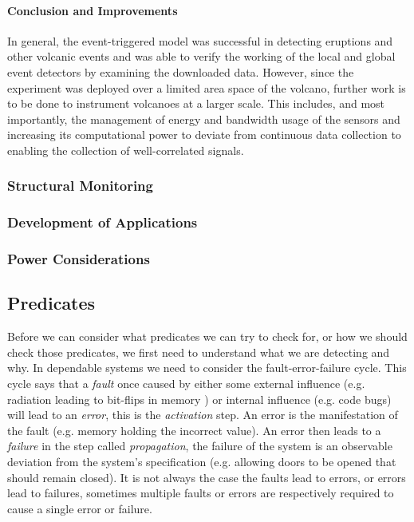 \paragraph{Conclusion and Improvements}

In general, the event-triggered model was successful in detecting eruptions and other volcanic events and was able to verify the working of the local and global event detectors by examining the downloaded data. However, since the experiment was deployed over a limited area space of the volcano, further work is to be done to instrument volcanoes at a larger scale. This includes, and most importantly, the management of energy and bandwidth usage of the sensors and increasing its computational power to deviate from continuous data collection to enabling the collection of well-correlated signals. 

\subsubsection{Structural Monitoring}
\cite{5508230}

\subsubsection{Development of Applications}
\cite{Fagerstrom:1988:DTD:55823.55833}


\subsubsection{Power Considerations}


\subsection{Predicates}

Before we can consider what predicates we can try to check for, or how we should check those predicates, we first need to understand what we are detecting and why. In dependable systems we need to consider the fault-error-failure cycle. This cycle says that a \emph{fault} once caused by either some external influence (e.g. radiation leading to bit-flips in memory \cite{?}) or internal influence (e.g. code bugs) will lead to an \emph{error}, this is the \emph{activation} step. An error is the manifestation of the fault (e.g. memory holding the incorrect value). An error then leads to a \emph{failure} in the step called \emph{propagation}, the failure of the system is an observable deviation from the system's specification (e.g. allowing doors to be opened that should remain closed). It is not always the case the faults lead to errors, or errors lead to failures, sometimes multiple faults or errors are respectively required to cause a single error or failure. \cite{1335465}


